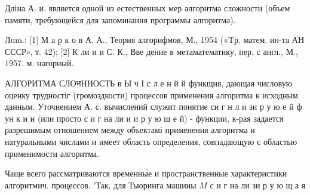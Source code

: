 \documentclass[10pt]{article}
\begin{document}
Дліна А. и. является одной из естественных мер алгоритма сложности (объем памяти, требующейся для запоминания программы алгоритма).



Лum.: [1] М а р к о в А. А., Теория алгорифмов, М., 1954 («Tр. матем. ин-та АН СССР», т. 42); [2] К ли н и С. К., Вве дение в метаматематику, пер. с англ., М., 1957. м. нагорный.



АЛГОРИТМА СЛОभННОСТЬ в Ы ч І с л е н й й функщия, дающая числовую оценку трудностіг (громоздкости) процессов применения алгоритма к исходным данным. Уточнением А. с. вычислений служит понятие си г н л и зи р у ю $е$ й ф ун к и и (или просто с и г на ли и и р у ю ш е й) - функции, к-рая задается разрешимым отношением между объектамі применения алгоритма и натуральными числами и имеет область определения, совпадающую с областью применимости алгоритма.



Чаще всего рассматриваются временны́е и пространственные характеристики алгоритмич. процессов. 'Так, для Тьюринга машины $M$ с и г на ли зи р у ю щ а я
\end{document}
